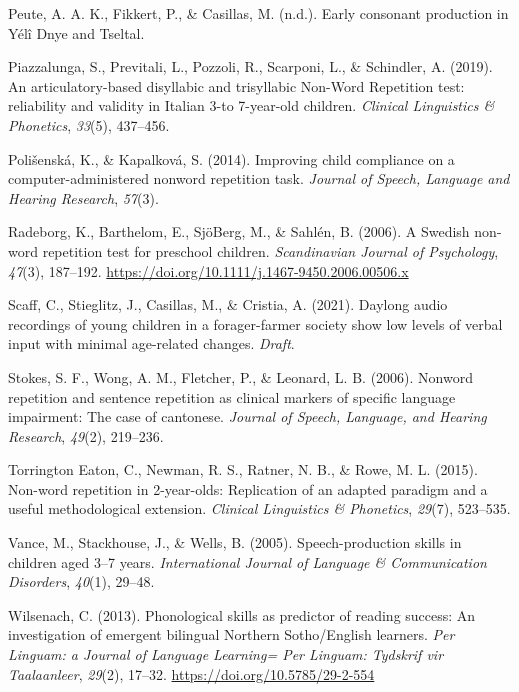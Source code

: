 \documentclass[english,,man,floatsintext]{apa6}
\begin{document}
\leavevmode\hypertarget{ref-peuteIPconsonants}{}%
Peute, A. A. K., Fikkert, P., \& Casillas, M. (n.d.). Early consonant production in Yélî Dnye and Tseltal.

\leavevmode\hypertarget{ref-piazzalunga2019articulatory}{}%
Piazzalunga, S., Previtali, L., Pozzoli, R., Scarponi, L., \& Schindler, A. (2019). An articulatory-based disyllabic and trisyllabic Non-Word Repetition test: reliability and validity in Italian 3-to 7-year-old children. \emph{Clinical Linguistics \& Phonetics}, \emph{33}(5), 437--456.

\leavevmode\hypertarget{ref-polivsenska2014improving}{}%
Polišenská, K., \& Kapalková, S. (2014). Improving child compliance on a computer-administered nonword repetition task. \emph{Journal of Speech, Language and Hearing Research}, \emph{57}(3).

\leavevmode\hypertarget{ref-radeborg2006swedish}{}%
Radeborg, K., Barthelom, E., SjöBerg, M., \& Sahlén, B. (2006). A Swedish non-word repetition test for preschool children. \emph{Scandinavian Journal of Psychology}, \emph{47}(3), 187--192. \url{https://doi.org/10.1111/j.1467-9450.2006.00506.x}

\leavevmode\hypertarget{ref-scaff2021daylong}{}%
Scaff, C., Stieglitz, J., Casillas, M., \& Cristia, A. (2021). Daylong audio recordings of young children in a forager-farmer society show low levels of verbal input with minimal age-related changes. \emph{Draft}.

\leavevmode\hypertarget{ref-stokes2006nonword}{}%
Stokes, S. F., Wong, A. M., Fletcher, P., \& Leonard, L. B. (2006). Nonword repetition and sentence repetition as clinical markers of specific language impairment: The case of cantonese. \emph{Journal of Speech, Language, and Hearing Research}, \emph{49}(2), 219--236.

\leavevmode\hypertarget{ref-torrington2015non}{}%
Torrington Eaton, C., Newman, R. S., Ratner, N. B., \& Rowe, M. L. (2015). Non-word repetition in 2-year-olds: Replication of an adapted paradigm and a useful methodological extension. \emph{Clinical Linguistics \& Phonetics}, \emph{29}(7), 523--535.

\leavevmode\hypertarget{ref-vance2005speech}{}%
Vance, M., Stackhouse, J., \& Wells, B. (2005). Speech-production skills in children aged 3--7 years. \emph{International Journal of Language \& Communication Disorders}, \emph{40}(1), 29--48.

\leavevmode\hypertarget{ref-wilsenach2013phonological}{}%
Wilsenach, C. (2013). Phonological skills as predictor of reading success: An investigation of emergent bilingual Northern Sotho/English learners. \emph{Per Linguam: a Journal of Language Learning= Per Linguam: Tydskrif vir Taalaanleer}, \emph{29}(2), 17--32. \url{https://doi.org/10.5785/29-2-554}
\end{document}
